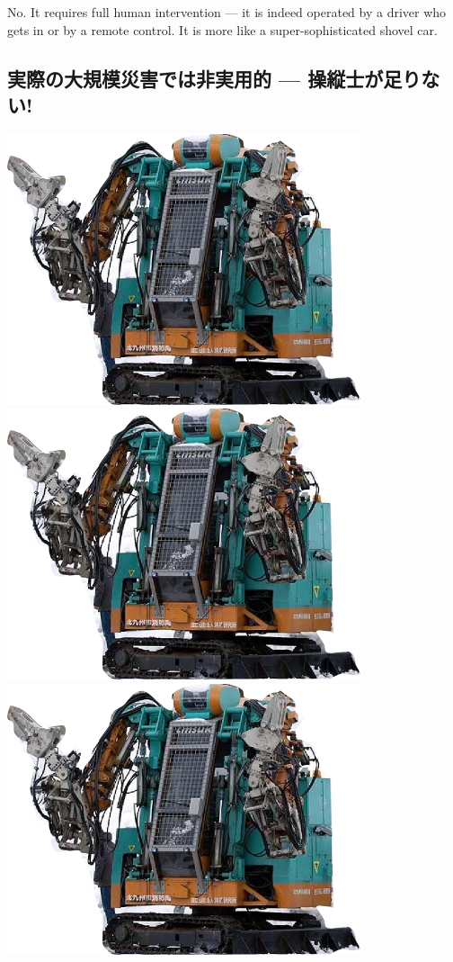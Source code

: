 \begin{resume}
No. It requires full human intervention --- it is indeed operated by a
driver who gets in or by a remote control. It is more like a
super-sophisticated shovel car.
\end{resume}

\subsection{実際の大規模災害では非実用的 --- 操縦士が足りない!}
\label{sec-4-2}

\begin{container-fluid}
\begin{row-fluid}
\begin{span2}
\includegraphics{img/rescue.png}
\includegraphics{img/rescue.png}
\includegraphics{img/rescue.png}

\end{span2}
\end{row-fluid}
\end{container-fluid}
